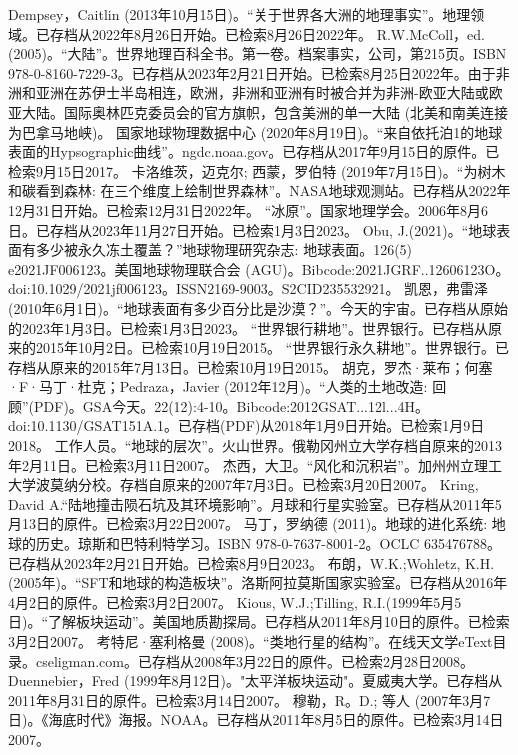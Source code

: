 \begin{enumerate}
 Dempsey，Caitlin (2013年10月15日)。“关于世界各大洲的地理事实”。地理领域。已存档从2022年8月26日开始。已检索8月26日2022年。
 R.W.McColl，ed. (2005)。“大陆”。世界地理百科全书。第一卷。档案事实，公司，第215页。ISBN 978-0-8160-7229-3。已存档从2023年2月21日开始。已检索8月25日2022年。由于非洲和亚洲在苏伊士半岛相连，欧洲，非洲和亚洲有时被合并为非洲-欧亚大陆或欧亚大陆。国际奥林匹克委员会的官方旗帜，包含美洲的单一大陆 (北美和南美连接为巴拿马地峡)。
 国家地球物理数据中心 (2020年8月19日)。“来自依托泊1的地球表面的Hypsographic曲线”。ngdc.noaa.gov。已存档从2017年9月15日的原件。已检索9月15日2017。
 卡洛维茨，迈克尔; 西蒙，罗伯特 (2019年7月15日)。“为树木和碳看到森林: 在三个维度上绘制世界森林”。NASA地球观测站。已存档从2022年12月31日开始。已检索12月31日2022年。
 “冰原”。国家地理学会。2006年8月6日。已存档从2023年11月27日开始。已检索1月3日2023。
 Obu, J.(2021)。“地球表面有多少被永久冻土覆盖？”地球物理研究杂志: 地球表面。126(5) e2021JF006123。美国地球物理联合会 (AGU)。Bibcode:2021JGRF..12606123O。doi:10.1029/2021jf006123。ISSN2169-9003。S2CID235532921。  
 凯恩，弗雷泽 (2010年6月1日)。“地球表面有多少百分比是沙漠？”。今天的宇宙。已存档从原始的2023年1月3日。已检索1月3日2023。
 “世界银行耕地”。世界银行。已存档从原来的2015年10月2日。已检索10月19日2015。
 “世界银行永久耕地”。世界银行。已存档从原来的2015年7月13日。已检索10月19日2015。
 胡克，罗杰·莱布；何塞·F·马丁·杜克；Pedraza，Javier (2012年12月)。“人类的土地改造: 回顾”(PDF)。GSA今天。22(12):4-10。Bibcode:2012GSAT...12l...4H。doi:10.1130/GSAT151A.1。已存档(PDF)从2018年1月9日开始。已检索1月9日2018。
 工作人员。“地球的层次”。火山世界。俄勒冈州立大学存档自原来的2013年2月11日。已检索3月11日2007。
 杰西，大卫。“风化和沉积岩”。加州州立理工大学波莫纳分校。存档自原来的2007年7月3日。已检索3月20日2007。
 Kring, David A.“陆地撞击陨石坑及其环境影响”。月球和行星实验室。已存档从2011年5月13日的原件。已检索3月22日2007。
 马丁，罗纳德 (2011)。地球的进化系统: 地球的历史。琼斯和巴特利特学习。ISBN 978-0-7637-8001-2。OCLC 635476788。已存档从2023年2月21日开始。已检索8月9日2023。
 布朗，W.K.;Wohletz, K.H. (2005年)。“SFT和地球的构造板块”。洛斯阿拉莫斯国家实验室。已存档从2016年4月2日的原件。已检索3月2日2007。
 Kious, W.J.;Tilling, R.I.(1999年5月5日)。“了解板块运动”。美国地质勘探局。已存档从2011年8月10日的原件。已检索3月2日2007。
 考特尼·塞利格曼 (2008)。“类地行星的结构”。在线天文学eText目录。cseligman.com。已存档从2008年3月22日的原件。已检索2月28日2008。
 Duennebier，Fred (1999年8月12日)。"太平洋板块运动"。夏威夷大学。已存档从2011年8月31日的原件。已检索3月14日2007。
 穆勒，R。D.; 等人 (2007年3月7日)。《海底时代》海报。NOAA。已存档从2011年8月5日的原件。已检索3月14日2007。

\end{enumerate}
